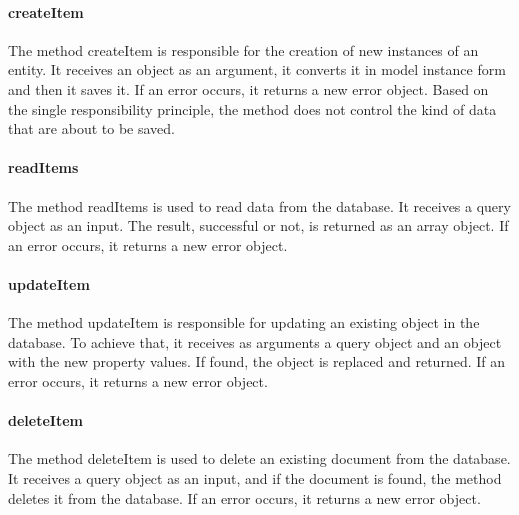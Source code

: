 \paragraph{createItem}
The method createItem is responsible for the creation of new instances of an entity. It receives an object as an argument, it converts it in model instance form and then it saves it. If an error occurs, it returns a new error object. Based on the single responsibility principle, the method does not control the kind of data that are about to be saved.
\paragraph{readItems}
The method readItems is used to read data from the database. It receives a query object as an input. The result, successful or not, is returned as an array object. If an error occurs, it returns a new error object.
\paragraph{updateItem}
The method updateItem is responsible for updating an existing object in the database. To achieve that, it receives as arguments a query object and an object with the new property values. If found, the object is replaced and returned. If an error occurs, it returns a new error object.
\paragraph{deleteItem}
The method deleteItem is used to delete an existing document from the database. It receives a query object as an input, and if the document is found, the method deletes it from the database. If an error occurs, it returns a new error object.


